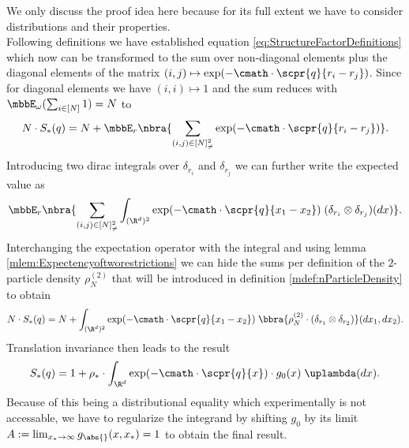 \begin{proofidea}
    We only discuss the proof idea here because for its full extent we have to consider distributions and their properties. \\

    \hspace{15pt} Following definitions we have established equation \eqref{eq:StructureFactorDefinitions} which now can be transformed to the sum over non-diagonal elements plus the diagonal elements of the matrix $(i,j)\mapsto \exp(-\cmath\cdot\scpr{q}{r_i - r_j})$. Since for diagonal elements we have $(i,i)\mapsto 1$ and the sum reduces with $\mbbE_\omega(\sum_{i\in[N]}1) = N$ to
    \[
        N\cdot S_*(q) = N + \mbbE_r\nbra{
            \sum_{(i,j)\in[N]^2_{\neq}}\exp(-\cmath\cdot\scpr{q}{r_i - r_j})
        }.
    \]
    Introducing two dirac integrals over $\delta_{r_i}$ and $\delta_{r_j}$ we can further write the expected value as
    \[
        \mbbE_r\nbra{
            \sum_{(i,j)\in[N]^2_{\neq}}\int_{(\R^d)^2}\exp(-\cmath\cdot\scpr{q}{x_1 - x_2})\;(\delta_{r_i}\otimes\delta_{r_j})(dx)
        }.
    \]
    Interchanging the expectation operator with the integral and using lemma \ref{mlem:Expectencyoftworestrictions} we can hide the sums per definition of the $2$-particle density $\rho_N^{(2)}$ that will be introduced in definition \ref{mdef:nParticleDensity} to obtain
    \[
        N\cdot S_*(q) = N + \int_{(\R^d)^2}\exp(-\cmath\cdot\scpr{q}{x_1 - x_2})\;\bbra{
            \rho_N^{(2)}\cdot(\delta_{r_1}\otimes\delta_{r_2})
        }(dx_1,dx_2).
    \]
    Translation invariance then leads to the result
    \[
        S_*(q) = 1 + \rho_*\cdot\int_{\R^d}\exp(-\cmath\cdot\scpr{q}{x})\cdot g_0(x)\;\uplambda(dx).
    \]
    Because of this being a distributional equality which experimentally is not accessable, we have to regularize the integrand by shifting $g_0$ by its limit $A:=\lim_{x_*\to\infty}g_{\abs{}}(x,x_*) = 1$ to obtain the final result.
\end{proofidea}